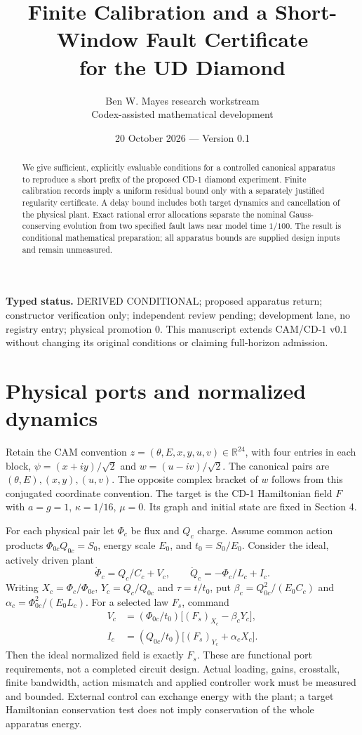 \documentclass[10pt,a4paper]{article}
\title{Finite Calibration and a Short-Window Fault Certificate\\for the UD Diamond}
\author{Ben W. Mayes research workstream\\Codex-assisted mathematical development}
\date{20 October 2026 --- Version 0.1}
\begin{document}
\maketitle
\begin{abstract}
We give sufficient, explicitly evaluable conditions for a controlled canonical apparatus to reproduce a short prefix of the proposed CD-1 diamond experiment. Finite calibration records imply a uniform residual bound only with a separately justified regularity certificate. A delay bound includes both target dynamics and cancellation of the physical plant. Exact rational error allocations separate the nominal Gauss-conserving evolution from two specified fault laws near model time $1/100$. The result is conditional mathematical preparation; all apparatus bounds are supplied design inputs and remain unmeasured.
\end{abstract}
\noindent\textbf{Typed status.} DERIVED CONDITIONAL; proposed apparatus return; constructor verification only; independent review pending; development lane, no registry entry; physical promotion 0. This manuscript extends CAM/CD-1 v0.1 without changing its original conditions or claiming full-horizon admission.

\section{Physical ports and normalized dynamics}
Retain the CAM convention $z=(\theta,E,x,y,u,v)\in\mathbb R^{24}$, with four entries in each block, $\psi=(x+iy)/\sqrt2$ and $w=(u-iv)/\sqrt2$. The canonical pairs are $(\theta,E),(x,y),(u,v)$. The opposite complex bracket of $w$ follows from this conjugated coordinate convention. The target is the CD-1 Hamiltonian field $F$ with $a=g=1$, $\kappa=1/16$, $\mu=0$. Its graph and initial state are fixed in Section 4.

For each physical pair let $\Phi_c$ be flux and $Q_c$ charge. Assume common action products $\Phi_{0c}Q_{0c}=S_0$, energy scale $E_0$, and $t_0=S_0/E_0$. Consider the ideal, actively driven plant
\begin{equation}
\dot\Phi_c=Q_c/C_c+V_c,\qquad
\dot Q_c=-\Phi_c/L_c+I_c .
\end{equation}
Writing $X_c=\Phi_c/\Phi_{0c}$, $Y_c=Q_c/Q_{0c}$ and $\tau=t/t_0$, put
$\beta_c=Q_{0c}^2/(E_0C_c)$ and $\alpha_c=\Phi_{0c}^2/(E_0L_c)$. For a selected law $F_s$, command
\begin{equation}
\begin{split}
V_c&=(\Phi_{0c}/t_0)\big[(F_s)_{X_c}-\beta_cY_c\big],\\
I_c&=(Q_{0c}/t_0)\big[(F_s)_{Y_c}+\alpha_cX_c\big].
\end{split}
\end{equation}
Then the ideal normalized field is exactly $F_s$. These are functional port requirements, not a completed circuit design. Actual loading, gains, crosstalk, finite bandwidth, action mismatch and applied controller work must be measured and bounded. External control can exchange energy with the plant; a target Hamiltonian conservation test does not imply conservation of the whole apparatus energy.
\newpage
\end{document}
